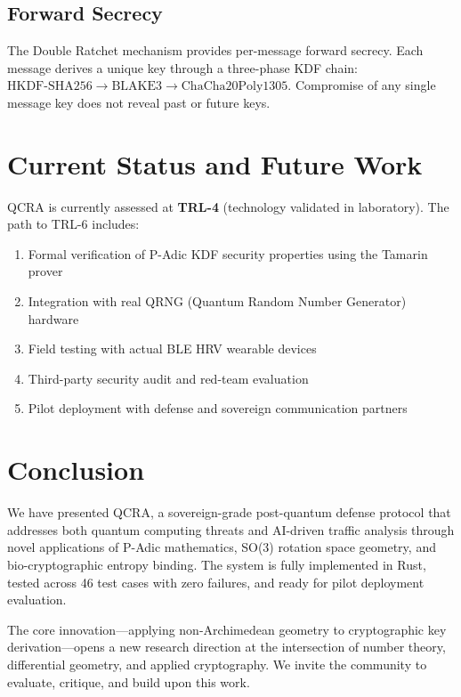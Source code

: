 \documentclass[11pt,a4paper]{article}
\begin{document}
\subsection{Forward Secrecy}

The Double Ratchet mechanism provides per-message forward secrecy.
Each message derives a unique key through a three-phase KDF chain:
$\text{HKDF-SHA256} \to \text{BLAKE3} \to \text{ChaCha20Poly1305}$.
Compromise of any single message key does not reveal past or future
keys.

\section{Current Status and Future Work}
\label{sec:future}

QCRA is currently assessed at \textbf{TRL-4} (technology validated in
laboratory). The path to TRL-6 includes:
\begin{enumerate}[nosep]
  \item Formal verification of P-Adic KDF security properties using
    the Tamarin prover
  \item Integration with real QRNG (Quantum Random Number Generator)
    hardware
  \item Field testing with actual BLE HRV wearable devices
  \item Third-party security audit and red-team evaluation
  \item Pilot deployment with defense and sovereign communication
    partners
\end{enumerate}

\section{Conclusion}
\label{sec:conclusion}

We have presented QCRA, a sovereign-grade post-quantum defense protocol
that addresses both quantum computing threats and AI-driven traffic
analysis through novel applications of P-Adic mathematics, SO(3) rotation
space geometry, and bio-cryptographic entropy binding. The system is fully
implemented in Rust, tested across 46 test cases with zero failures, and
ready for pilot deployment evaluation.

The core innovation---applying non-Archimedean geometry to cryptographic
key derivation---opens a new research direction at the intersection of
number theory, differential geometry, and applied cryptography. We invite
the community to evaluate, critique, and build upon this work.
\end{document}
